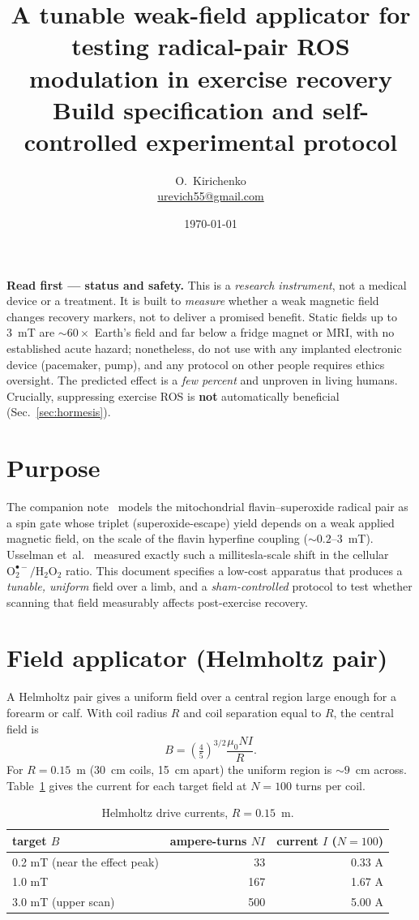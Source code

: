 \documentclass[11pt,a4paper]{article}
\title{\textbf{A tunable weak-field applicator for testing radical-pair
ROS modulation in exercise recovery}\\[4pt]
\large Build specification and self-controlled experimental protocol}
\author{O.~Kirichenko\\[2pt]\small
  \href{mailto:urevich55@gmail.com}{urevich55@gmail.com}}
\date{\today}
\newcommand{\warn}[1]{\par\noindent\colorbox{red!8}{\parbox{\dimexpr\linewidth-2\fboxsep}{#1}}\par}
\begin{document}
\maketitle

\warn{\textbf{Read first — status and safety.} This is a
\emph{research instrument}, not a medical device or a treatment. It is
built to \emph{measure} whether a weak magnetic field changes recovery
markers, not to deliver a promised benefit. Static fields up to 3~mT are
$\sim\!60\times$ Earth's field and far below a fridge magnet or MRI, with
no established acute hazard; nonetheless, do not use with any implanted
electronic device (pacemaker, pump), and any protocol on other people
requires ethics oversight. The predicted effect is a \emph{few percent}
and unproven in living humans. Crucially, suppressing exercise ROS is
\textbf{not} automatically beneficial (Sec.~\ref{sec:hormesis}).}

\section{Purpose}
The companion note~\cite{cisspaper} models the mitochondrial
flavin--superoxide radical pair as a spin gate whose triplet
(superoxide-escape) yield depends on a weak applied magnetic field, on the
scale of the flavin hyperfine coupling ($\sim\!0.2$--$3$~mT). Usselman
et~al.~\cite{usselman} measured exactly such a millitesla-scale shift in
the cellular $\text{O}_2^{\bullet-}/\text{H}_2\text{O}_2$ ratio. This
document specifies a low-cost apparatus that produces a \emph{tunable,
uniform} field over a limb, and a \emph{sham-controlled} protocol to test
whether scanning that field measurably affects post-exercise recovery.

\section{Field applicator (Helmholtz pair)}
A Helmholtz pair gives a uniform field over a central region large enough
for a forearm or calf. With coil radius $R$ and coil separation equal to
$R$, the central field is
\begin{equation}
  B = \left(\tfrac{4}{5}\right)^{3/2}\frac{\mu_0 N I}{R}.
\end{equation}
For $R=0.15$~m (30~cm coils, 15~cm apart) the uniform region is
$\sim\!9$~cm across. Table~\ref{tab:coil} gives the current for each
target field at $N=100$ turns per coil.

\begin{table}[h]
\centering
\begin{tabular}{lrr}
\toprule
target $B$ & ampere-turns $NI$ & current $I$ ($N{=}100$)\\
\midrule
0.2 mT (near the effect peak) & 33 & 0.33 A\\
1.0 mT & 167 & 1.67 A\\
3.0 mT (upper scan) & 500 & 5.00 A\\
\bottomrule
\end{tabular}
\caption{Helmholtz drive currents, $R=0.15$~m.}
\label{tab:coil}
\end{table}
\end{document}
